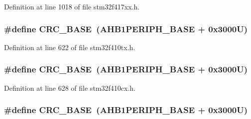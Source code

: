 Definition at line 1018 of file stm32f417xx.\+h.

\subsubsection[{\texorpdfstring{C\+R\+C\+\_\+\+B\+A\+SE}{CRC_BASE}}]{\setlength{\rightskip}{0pt plus 5cm}\#define C\+R\+C\+\_\+\+B\+A\+SE~({\bf A\+H\+B1\+P\+E\+R\+I\+P\+H\+\_\+\+B\+A\+SE} + 0x3000\+U)}\hypertarget{group___peripheral__registers__structures_ga656a447589e785594cbf2f45c835ad7e}{}\label{group___peripheral__registers__structures_ga656a447589e785594cbf2f45c835ad7e}


Definition at line 622 of file stm32f410tx.\+h.

\subsubsection[{\texorpdfstring{C\+R\+C\+\_\+\+B\+A\+SE}{CRC_BASE}}]{\setlength{\rightskip}{0pt plus 5cm}\#define C\+R\+C\+\_\+\+B\+A\+SE~({\bf A\+H\+B1\+P\+E\+R\+I\+P\+H\+\_\+\+B\+A\+SE} + 0x3000\+U)}\hypertarget{group___peripheral__registers__structures_ga656a447589e785594cbf2f45c835ad7e}{}\label{group___peripheral__registers__structures_ga656a447589e785594cbf2f45c835ad7e}


Definition at line 628 of file stm32f410cx.\+h.

\subsubsection[{\texorpdfstring{C\+R\+C\+\_\+\+B\+A\+SE}{CRC_BASE}}]{\setlength{\rightskip}{0pt plus 5cm}\#define C\+R\+C\+\_\+\+B\+A\+SE~({\bf A\+H\+B1\+P\+E\+R\+I\+P\+H\+\_\+\+B\+A\+SE} + 0x3000\+U)}\hypertarget{group___peripheral__registers__structures_ga656a447589e785594cbf2f45c835ad7e}{}\label{group___peripheral__registers__structures_ga656a447589e785594cbf2f45c835ad7e}


